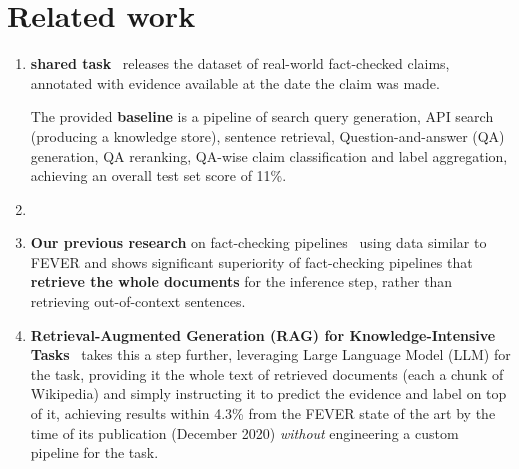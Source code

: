 \section{Related work}
\label{sec:relwork}
\label{avscore}
\begin{enumerate}
    \item \textbf{\averitec{} shared task}~\cite{averitec2024} releases the dataset of real-world fact-checked claims, annotated with evidence available at the date the claim was made.
    

    The provided \textbf{baseline} is a pipeline of search query generation, API search (producing a knowledge store), sentence retrieval, Question-and-answer (QA) generation, QA reranking, QA-wise claim classification and label aggregation, achieving an overall \averitec{} test set score of 11\%.  
    \item {}
    \item \textbf{Our previous research} on fact-checking pipelines~\cite{Ullrich2023,drchal2023pipelinedatasetgenerationautomated} using data similar to FEVER and \averitec{} shows significant superiority of fact-checking pipelines that \textbf{retrieve the whole documents} for the inference step, rather than retrieving out-of-context sentences.
    \item \textbf{Retrieval-Augmented Generation (RAG) for Knowledge-Intensive Tasks}~\cite{rag} takes this a step further, leveraging Large Language Model (LLM) for the task, providing it the whole text of retrieved documents (each a chunk of Wikipedia) and simply instructing it to predict the evidence and label on top of it, achieving results within 4.3\% from the FEVER state of the art by the time of its publication (December 2020) \textit{without} engineering a custom pipeline for the task.
\end{enumerate}

